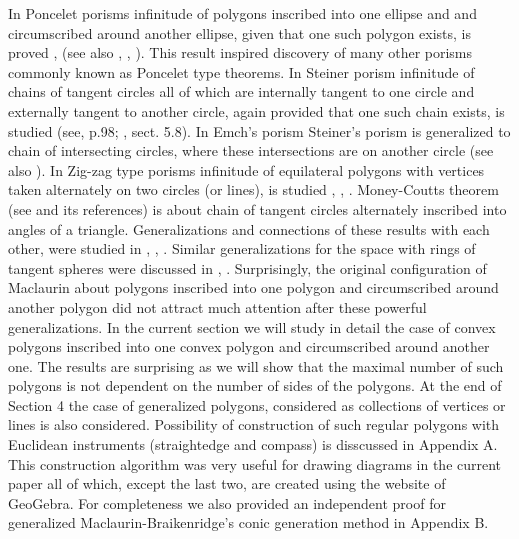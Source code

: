 \documentclass{birkjour}
\theoremstyle{definition}
\theoremstyle{remark}
\numberwithin{equation}{section}
\begin{document}
In Poncelet porisms infinitude of polygons inscribed into one ellipse and and circumscribed around another ellipse, given that one such polygon exists, is proved \cite{poncelet}, \cite{poncelet2} (see also \cite{centina}, \cite{centina2}, \cite{halb}). This result inspired discovery of many other porisms commonly known as Poncelet type theorems. In Steiner porism infinitude of chains of tangent circles all of which are internally tangent to one circle and externally tangent to another circle, again provided that one such chain exists, is studied (see\cite{pedoe}, p.98; \cite{coxeter}, sect. 5.8). In Emch's porism Steiner's porism is generalized to chain of intersecting circles, where these intersections are on another circle \cite{emch} (see also \cite{avk}). In Zig-zag type porisms infinitude of equilateral polygons with vertices taken alternately on two circles (or lines), is studied \cite{bottema}, \cite{hras}, \cite{csikos}. Money-Coutts theorem (see \cite{tabach} and its references) is about chain of tangent circles alternately inscribed into angles of a triangle. Generalizations and connections of these results with each other, were studied in \cite{bauer}, \cite{protasov}, \cite{drag}. Similar generalizations for the space with rings of tangent spheres were discussed in \cite{koll}, \cite{coxeter0}. Surprisingly, the original configuration of Maclaurin about polygons inscribed into one polygon and circumscribed around another polygon did not attract much attention after these powerful generalizations. In the current section we will study in detail the case of convex polygons inscribed into one convex polygon and circumscribed around another one. The results are surprising as we will show that the maximal number of such polygons is not dependent on the number of sides of the polygons. At the end of Section 4 the case of generalized polygons, considered as collections of vertices or lines is also considered. Possibility of construction of such regular polygons with Euclidean instruments (straightedge and compass) is disscussed in Appendix A. This construction algorithm was very useful for drawing diagrams in the current paper all of which, except the last two, are created using the website of GeoGebra. For completeness we also provided an independent proof for generalized Maclaurin-Braikenridge's conic generation method in Appendix B. 
\end{document}
